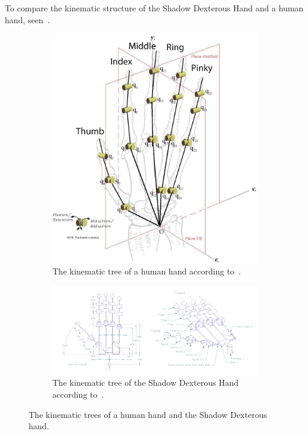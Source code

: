 To compare the kinematic structure of the Shadow Dexterous Hand and a human hand, seen~.

\begin{figure}[h]
	\centering
	\begin{subfigure}[b]{0.3\textwidth}
		\centering
		\includegraphics[width=\textwidth]{chapters/appendix/fig/human-hand-kinematics.pdf}
		\caption{The kinematic tree of a human hand according to~\cite{grasp-synthesis-algorithms-for-multifingered-robot-hands}.}
		\label{app:human-hand-kinematics}
	\end{subfigure}
	\hfill
	\begin{subfigure}[b]{0.69\textwidth}
		\centering
		\includegraphics[width=\textwidth]{chapters/appendix/fig/robot-hand-kinematics.pdf}
		\caption{The kinematic tree of the Shadow Dexterous Hand according to~\cite{robot-hand-kinematics}. \newline}
		\label{app:robot-hand-kinematics}
	\end{subfigure}
	\caption{The kinematic trees of a human hand and the Shadow Dexterous hand.}
	\label{app:human-and-robot-hand-kinematics}
\end{figure}

